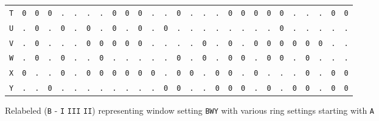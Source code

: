 \begin{figure}[H]
\begin{center}
{\begin{tabular}{c|cccccccccccccccccccccccccc}
        \texttt{T} & \texttt{0} & \texttt{0} & \texttt{0} &
        \texttt{.} & \texttt{.} & \texttt{.} & \texttt{.} &
        \texttt{0} & \texttt{0} & \texttt{0} & \texttt{.} &
        \texttt{.} & \texttt{0} & \texttt{.} & \texttt{.} &
        \texttt{.} & \texttt{0} & \texttt{0} & \texttt{0} &
        \texttt{0} & \texttt{0} & \texttt{.} & \texttt{.} &
        \texttt{.} & \texttt{0} & \texttt{0}                             \\
        \texttt{U} & \texttt{.} & \texttt{0} & \texttt{.} &
        \texttt{0} & \texttt{.} & \texttt{0} & \texttt{.} &
        \texttt{0} & \texttt{.} & \texttt{0} & \texttt{.} &
        \texttt{0} & \texttt{.} & \texttt{.} & \texttt{.} &
        \texttt{.} & \texttt{.} & \texttt{.} & \texttt{.} &
        \texttt{.} & \texttt{0} & \texttt{.} & \texttt{.} &
        \texttt{.} & \texttt{.} & \texttt{.}                             \\
        \texttt{V} & \texttt{.} & \texttt{0} & \texttt{.} &
        \texttt{.} & \texttt{.} & \texttt{0} & \texttt{0} &
        \texttt{0} & \texttt{0} & \texttt{0} & \texttt{.} &
        \texttt{.} & \texttt{.} & \texttt{.} & \texttt{0} &
        \texttt{.} & \texttt{0} & \texttt{.} & \texttt{0} &
        \texttt{0} & \texttt{0} & \texttt{0} & \texttt{0} &
        \texttt{0} & \texttt{.} & \texttt{.}                             \\
        \texttt{W} & \texttt{.} & \texttt{0} & \texttt{.} &
        \texttt{0} & \texttt{.} & \texttt{.} & \texttt{0} &
        \texttt{.} & \texttt{.} & \texttt{.} & \texttt{.} &
        \texttt{.} & \texttt{0} & \texttt{.} & \texttt{0} &
        \texttt{.} & \texttt{0} & \texttt{0} & \texttt{.} &
        \texttt{0} & \texttt{0} & \texttt{.} & \texttt{0} &
        \texttt{.} & \texttt{.} & \texttt{.}                             \\
        \texttt{X} & \texttt{0} & \texttt{.} & \texttt{.} &
        \texttt{0} & \texttt{.} & \texttt{0} & \texttt{0} &
        \texttt{0} & \texttt{0} & \texttt{0} & \texttt{0} &
        \texttt{.} & \texttt{0} & \texttt{0} & \texttt{.} &
        \texttt{0} & \texttt{0} & \texttt{.} & \texttt{0} &
        \texttt{.} & \texttt{.} & \texttt{.} & \texttt{0} &
        \texttt{.} & \texttt{0} & \texttt{0}                             \\
        \texttt{Y} & \texttt{.} & \texttt{.} & \texttt{0} &
        \texttt{.} & \texttt{.} & \texttt{.} & \texttt{.} &
        \texttt{.} & \texttt{.} & \texttt{.} & \texttt{.} &
        \texttt{0} & \texttt{0} & \texttt{.} & \texttt{.} &
        \texttt{0} & \texttt{0} & \texttt{0} & \texttt{.} &
        \texttt{0} & \texttt{.} & \texttt{0} & \texttt{0} &
        \texttt{.} & \texttt{0} & \texttt{0}                             \\
    \end{tabular}}
  \end{center}
  \caption{Relabeled (\texttt{B} - \texttt{I} \texttt{III}
    \texttt{II}) representing window setting \texttt{BWY} with various
  ring settings starting with \texttt{A}}
  \label{fig:zygalski_sheet_ring}
\end{figure}

